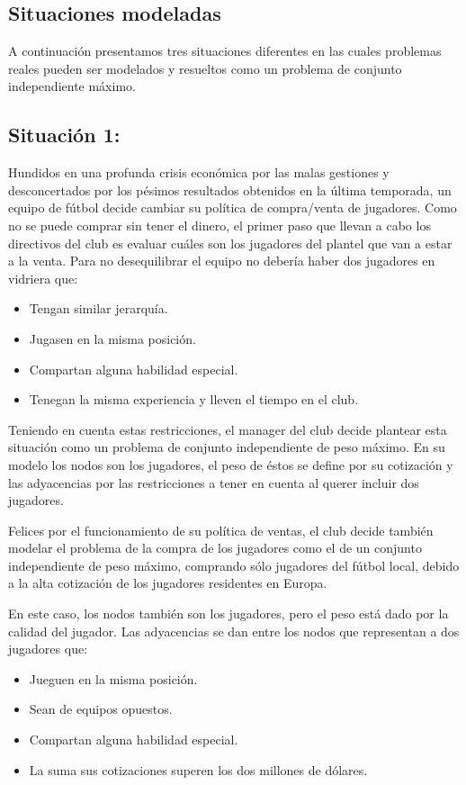\documentclass[a4paper,11pt] {article}
\begin{document}
\subsection{Situaciones modeladas}

A continuación presentamos tres situaciones diferentes en las cuales problemas reales pueden ser modelados y resueltos como un problema de conjunto independiente máximo.

\subsection*{Situación 1:}

Hundidos en  una profunda crisis económica por las malas gestiones y desconcertados por los pésimos resultados obtenidos en la última temporada, un equipo de fútbol decide cambiar su política de compra/venta de jugadores. Como no se puede comprar sin tener el dinero, el primer paso que llevan a cabo los directivos del club es evaluar cuáles son los jugadores del plantel que van a estar a la venta. 
Para no desequilibrar el equipo no debería haber dos jugadores en vidriera que:
\begin{itemize}
\item Tengan similar jerarquía.
\item Jugasen en la misma posición.
\item Compartan alguna habilidad especial.
\item Tenegan la misma experiencia y lleven el tiempo en el club.
\end{itemize}

Teniendo en cuenta estas restricciones, el manager del club decide plantear esta situación como un problema de conjunto independiente de peso máximo. En su modelo los nodos son los jugadores, el peso de éstos se define por su cotización y las adyacencias por las restricciones a tener en cuenta al querer incluir dos jugadores.
\bigskip

Felices por el funcionamiento de su política de ventas, el club decide también modelar el problema de la compra de los jugadores como el de un conjunto independiente de peso máximo, comprando sólo jugadores del fútbol local, debido a la alta cotización de los jugadores residentes en Europa.

En este caso, los nodos también son los jugadores, pero el peso está dado por la calidad del jugador. Las adyacencias se dan entre los nodos que representan a dos jugadores que:
\begin{itemize}
\item Jueguen en la misma posición.
\item Sean de equipos opuestos.
\item Compartan alguna habilidad especial.
\item La suma sus cotizaciones superen los dos millones de dólares.
\end{itemize}
\end{document}
